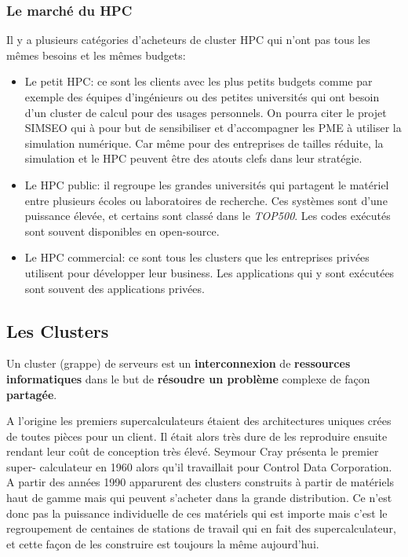 \subsubsection{Le marché du HPC}
Il y a plusieurs catégories d'acheteurs de cluster HPC qui n'ont pas tous les mêmes besoins et les mêmes budgets:
\begin{itemize}
    \item Le petit HPC: ce sont les clients avec les plus petits budgets comme par exemple des équipes d'ingénieurs ou des petites universités qui ont besoin d'un cluster de calcul pour des usages personnels. On pourra citer le projet SIMSEO qui à pour but de sensibiliser et d'accompagner les PME à utiliser la simulation numérique. Car même pour des entreprises de tailles réduite, la simulation et le HPC peuvent être des atouts clefs dans leur stratégie.
    \item Le HPC public: il regroupe les grandes universités qui partagent le matériel entre plusieurs écoles ou laboratoires de recherche. Ces systèmes sont d'une puissance élevée, et certains sont classé dans le \textit{TOP500}. Les codes exécutés sont souvent disponibles en open-source.
    \item Le HPC commercial: ce sont tous les clusters que les entreprises privées utilisent pour développer leur business. Les applications qui y sont exécutées sont souvent des applications privées.
\end{itemize}




\subsection{Les Clusters}
\begin{fancyquotes}
Un cluster (grappe) de serveurs est un \textbf{interconnexion} de \textbf{ressources informatiques} dans le but de \textbf{résoudre un problème} complexe de façon \textbf{partagée}. 
\end{fancyquotes}

A l'origine les premiers supercalculateurs étaient des architectures uniques crées de toutes pièces pour un client. Il était alors très dure de les reproduire ensuite rendant leur coût de conception très élevé. Seymour Cray présenta le premier super- calculateur en 1960 alors qu'il travaillait pour Control Data Corporation. A partir des années 1990 apparurent des clusters construits à partir de matériels haut de gamme mais qui peuvent s'acheter dans la grande distribution. Ce n'est donc pas la puissance individuelle de ces matériels qui est importe mais c'est le regroupement de centaines de stations de travail qui en fait des supercalculateur, et cette façon de les construire est toujours la même aujourd'hui.\\



